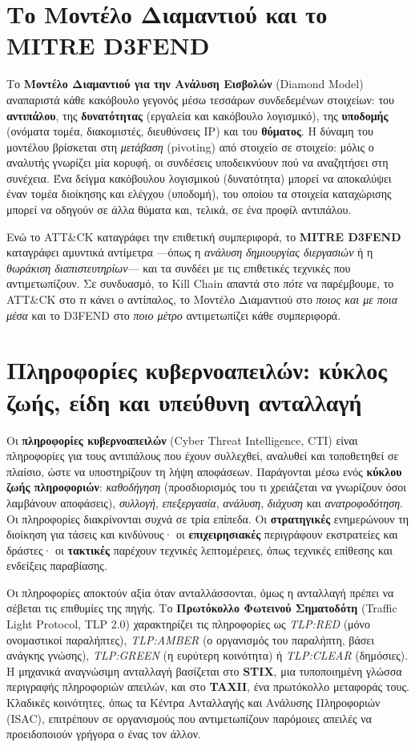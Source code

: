 \documentclass[11pt,openany]{book}
\begin{document}
\section{Το Μοντέλο Διαμαντιού και το MITRE D3FEND}\label{sec:3.5}
Το \textbf{Μοντέλο Διαμαντιού για την Ανάλυση Εισβολών} (Diamond Model) αναπαριστά κάθε κακόβουλο γεγονός μέσω τεσσάρων συνδεδεμένων στοιχείων: του \textbf{αντιπάλου}, της \textbf{δυνατότητας} (εργαλεία και κακόβουλο λογισμικό), της \textbf{υποδομής} (ονόματα τομέα, διακομιστές, διευθύνσεις IP) και του \textbf{θύματος}. Η δύναμη του μοντέλου βρίσκεται στη \emph{μετάβαση} (pivoting) από στοιχείο σε στοιχείο: μόλις ο αναλυτής γνωρίζει μία κορυφή, οι συνδέσεις υποδεικνύουν πού να αναζητήσει στη συνέχεια. Ένα δείγμα κακόβουλου λογισμικού (δυνατότητα) μπορεί να αποκαλύψει έναν τομέα διοίκησης και ελέγχου (υποδομή), του οποίου τα στοιχεία καταχώρισης μπορεί να οδηγούν σε άλλα θύματα και, τελικά, σε ένα προφίλ αντιπάλου.

Ενώ το ATT\&CK καταγράφει την επιθετική συμπεριφορά, το \textbf{MITRE D3FEND} καταγράφει αμυντικά αντίμετρα —όπως η \emph{ανάλυση δημιουργίας διεργασιών} ή η \emph{θωράκιση διαπιστευτηρίων}— και τα συνδέει με τις επιθετικές τεχνικές που αντιμετωπίζουν. Σε συνδυασμό, το Kill Chain απαντά στο \emph{πότε} να παρέμβουμε, το ATT\&CK στο \emph{τι} κάνει ο αντίπαλος, το Μοντέλο Διαμαντιού στο \emph{ποιος και με ποια μέσα} και το D3FEND στο \emph{ποιο μέτρο} αντιμετωπίζει κάθε συμπεριφορά.

\section{Πληροφορίες κυβερνοαπειλών: κύκλος ζωής, είδη και υπεύθυνη ανταλλαγή}\label{sec:3.6}
Οι \textbf{πληροφορίες κυβερνοαπειλών} (Cyber Threat Intelligence, CTI) είναι πληροφορίες για τους αντιπάλους που έχουν συλλεχθεί, αναλυθεί και τοποθετηθεί σε πλαίσιο, ώστε να υποστηρίζουν τη λήψη αποφάσεων. Παράγονται μέσω ενός \textbf{κύκλου ζωής πληροφοριών}: \emph{καθοδήγηση} (προσδιορισμός του τι χρειάζεται να γνωρίζουν όσοι λαμβάνουν αποφάσεις), \emph{συλλογή}, \emph{επεξεργασία}, \emph{ανάλυση}, \emph{διάχυση} και \emph{ανατροφοδότηση}. Οι πληροφορίες διακρίνονται συχνά σε τρία επίπεδα. Οι \textbf{στρατηγικές} ενημερώνουν τη διοίκηση για τάσεις και κινδύνους· οι \textbf{επιχειρησιακές} περιγράφουν εκστρατείες και δράστες· οι \textbf{τακτικές} παρέχουν τεχνικές λεπτομέρειες, όπως τεχνικές επίθεσης και ενδείξεις παραβίασης.

Οι πληροφορίες αποκτούν αξία όταν ανταλλάσσονται, όμως η ανταλλαγή πρέπει να σέβεται τις επιθυμίες της πηγής. Το \textbf{Πρωτόκολλο Φωτεινού Σηματοδότη} (Traffic Light Protocol, TLP 2.0) χαρακτηρίζει τις πληροφορίες ως \emph{TLP:RED} (μόνο ονομαστικοί παραλήπτες), \emph{TLP:AMBER} (ο οργανισμός του παραλήπτη, βάσει ανάγκης γνώσης), \emph{TLP:GREEN} (η ευρύτερη κοινότητα) ή \emph{TLP:CLEAR} (δημόσιες). Η μηχανικά αναγνώσιμη ανταλλαγή βασίζεται στο \textbf{STIX}, μια τυποποιημένη γλώσσα περιγραφής πληροφοριών απειλών, και στο \textbf{TAXII}, ένα πρωτόκολλο μεταφοράς τους. Κλαδικές κοινότητες, όπως τα Κέντρα Ανταλλαγής και Ανάλυσης Πληροφοριών (ISAC), επιτρέπουν σε οργανισμούς που αντιμετωπίζουν παρόμοιες απειλές να προειδοποιούν γρήγορα ο ένας τον άλλον.
\end{document}
